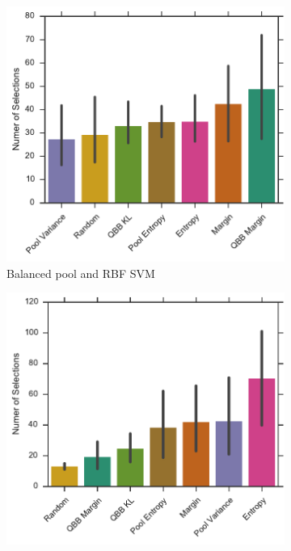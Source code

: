 \begin{figure}[p]
\begin{subfigure}{.5\textwidth}
        \includegraphics[width=\linewidth]{figures/5_thompson/vstatlas_br_no_selections}
        \caption{Balanced pool and RBF SVM}
        \label{fig:vstatlas_br_no_selections}
    \end{subfigure}
    \begin{subfigure}{.5\textwidth}
        \centering
        \includegraphics[width=\textwidth]{figures/5_thompson/vstatlas_ul_no_selections}

\end{subfigure}
\end{figure}
